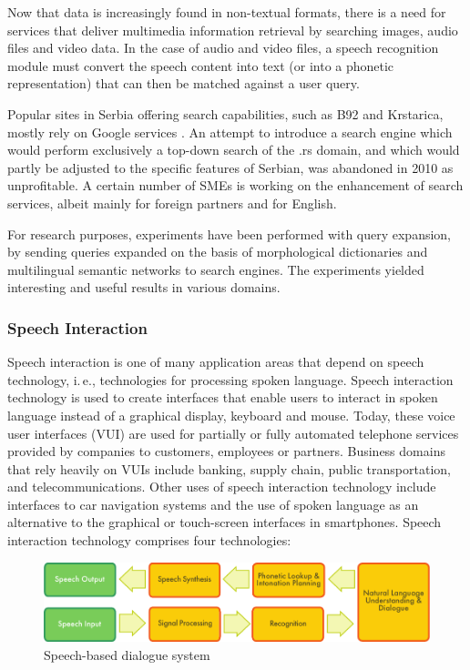 \begin{multicols}{2}
Now that data is increasingly found in non-textual formats, there is a need for services that deliver multimedia information retrieval by searching images, audio files and video data. In the case of audio and video files, a speech recognition module must convert the speech content into text (or into a phonetic representation) that can then be matched against a user query.

Popular sites in Serbia offering search capabilities, such as B92 and Krstarica, mostly rely on Google services \cite{ALEXA}. An attempt to introduce a search engine which would perform exclusively a top-down search of the .rs domain, and which would partly be adjusted to the specific features of Serbian, was abandoned in 2010 as unprofitable. A certain number of SMEs is working on the enhancement of search services, albeit mainly for foreign partners and for English. 

For research purposes, experiments have been performed with query expansion, by sending queries expanded on the basis of morphological dictionaries and multilingual semantic networks to search engines. The experiments yielded interesting and useful results in various domains.  

 \subsubsection {Speech Interaction}
   

Speech interaction is one of many application areas that depend on speech technology, i.\,e., technologies for processing spoken language. Speech interaction technology is used to create interfaces that enable users to interact in spoken language instead of a graphical display, keyboard and mouse. Today, these voice user interfaces (VUI) are used for partially or fully automated telephone services provided by companies to customers, employees or partners. Business domains that rely heavily on VUIs include banking, supply chain, public transportation, and telecommunications. Other uses of speech interaction technology include interfaces to car navigation systems and the use of spoken language as an alternative to the graphical or touch-screen interfaces in smartphones. 
Speech interaction technology comprises four technologies: 

\begin{figure}[htb]
  \center
  \includegraphics[width=\textwidth]{../_media/english/simple_speech-based_dialogue_architecture}
  \caption{Speech-based dialogue system}
  \label{fig:dialoguearch_en}
\end{figure}



\end{multicols}
